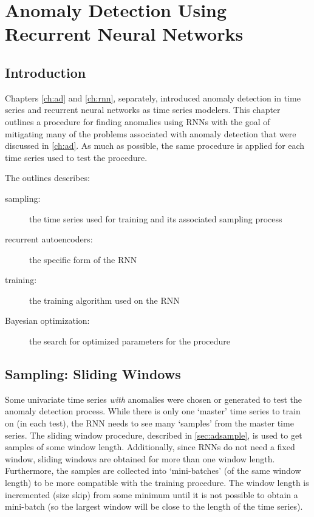 \chapter[]{Anomaly Detection Using Recurrent Neural Networks}


\section{Introduction}

Chapters \ref{ch:ad} and \ref{ch:rnn}, separately, introduced anomaly detection in time series and recurrent neural networks as time series modelers.
%
This chapter outlines a procedure for finding anomalies using RNNs with the goal of mitigating many of the problems associated with anomaly detection that were discussed in \ref{ch:ad}.
%
As much as possible, the same procedure is applied for each time series used to test the procedure.


The outlines describes:
%
\begin{description}
%
\item[sampling:] the time series used for training and its associated sampling process
%
\item[recurrent autoencoders:] the specific form of the RNN
%
\item[training:] the training algorithm used on the RNN
%
\item[Bayesian optimization:] the search for optimized parameters for the procedure
%
\end{description}



\section{Sampling: Sliding Windows}
\label{sec:sampling}

Some univariate time series \emph{with} anomalies were chosen or generated to test the anomaly detection process.
%
While there is only one `master' time series to train on (in each test), the RNN needs to see many `samples' from the master time series.
%
The sliding window procedure, described in \ref{sec:adsample}, is used to get samples of some window length.
%
Additionally, since RNNs do not need a fixed window, sliding windows are obtained for more than one window length.
%
Furthermore, the samples are collected into `mini-batches' (of the same window length) to be more compatible with the training procedure.
%
The window length is incremented (size skip) from some minimum until it is not possible to obtain a mini-batch (so the largest window will be close to the length of the time series).


